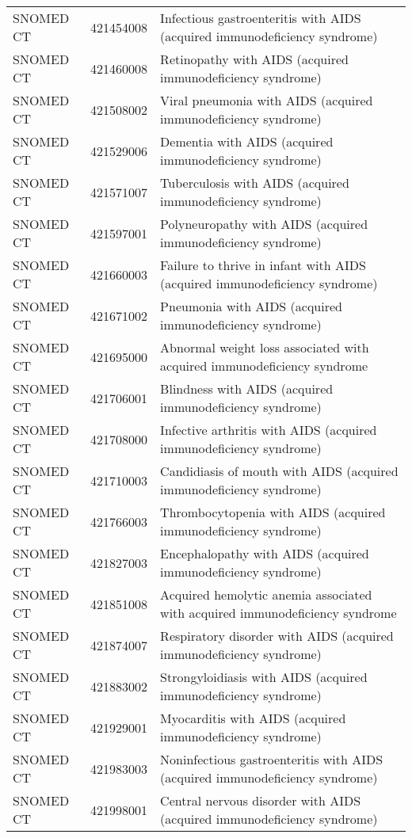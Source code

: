 \begin{longtable}{p{}p{}p{}}
  SNOMED CT & 421454008 & Infectious gastroenteritis with AIDS (acquired immunodeficiency syndrome) \\ 
  SNOMED CT & 421460008 & Retinopathy with AIDS (acquired immunodeficiency syndrome) \\ 
  SNOMED CT & 421508002 & Viral pneumonia with AIDS (acquired immunodeficiency syndrome) \\ 
  SNOMED CT & 421529006 & Dementia with AIDS (acquired immunodeficiency syndrome) \\ 
  SNOMED CT & 421571007 & Tuberculosis with AIDS (acquired immunodeficiency syndrome) \\ 
  SNOMED CT & 421597001 & Polyneuropathy with AIDS (acquired immunodeficiency syndrome) \\ 
  SNOMED CT & 421660003 & Failure to thrive in infant with AIDS (acquired immunodeficiency syndrome) \\ 
  SNOMED CT & 421671002 & Pneumonia with AIDS (acquired immunodeficiency syndrome) \\ 
  SNOMED CT & 421695000 & Abnormal weight loss associated with acquired immunodeficiency syndrome \\ 
  SNOMED CT & 421706001 & Blindness with AIDS (acquired immunodeficiency syndrome) \\ 
  SNOMED CT & 421708000 & Infective arthritis with AIDS (acquired immunodeficiency syndrome) \\ 
  SNOMED CT & 421710003 & Candidiasis of mouth with AIDS (acquired immunodeficiency syndrome) \\ 
  SNOMED CT & 421766003 & Thrombocytopenia with AIDS (acquired immunodeficiency syndrome) \\ 
  SNOMED CT & 421827003 & Encephalopathy with AIDS (acquired immunodeficiency syndrome) \\ 
  SNOMED CT & 421851008 & Acquired hemolytic anemia associated with acquired immunodeficiency syndrome \\ 
  SNOMED CT & 421874007 & Respiratory disorder with AIDS (acquired immunodeficiency syndrome) \\ 
  SNOMED CT & 421883002 & Strongyloidiasis with AIDS (acquired immunodeficiency syndrome) \\ 
  SNOMED CT & 421929001 & Myocarditis with AIDS (acquired immunodeficiency syndrome) \\ 
  SNOMED CT & 421983003 & Noninfectious gastroenteritis with AIDS (acquired immunodeficiency syndrome) \\ 
  SNOMED CT & 421998001 & Central nervous disorder with AIDS (acquired immunodeficiency syndrome) \\ 

\end{longtable}
